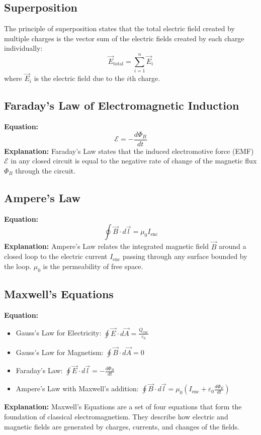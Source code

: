 \documentclass{article}
\begin{document}
\subsection*{Superposition}
The principle of superposition states that the total electric field created by multiple charges is the vector sum of the electric fields created by each charge individually:
\begin{equation}
    \vec{E}_{\text{total}} = \sum_{i=1}^{n} \vec{E}_i
\end{equation}
where $\vec{E}_i$ is the electric field due to the $i$th charge.


\subsection*{Faraday's Law of Electromagnetic Induction}
\textbf{Equation:} 
\[ \mathcal{E} = -\frac{d\Phi_B}{dt} \]
\textbf{Explanation:} 
Faraday's Law states that the induced electromotive force (EMF) \( \mathcal{E} \) in any closed circuit is equal to the negative rate of change of the magnetic flux \( \Phi_B \) through the circuit.

\subsection*{Ampere's Law}
\textbf{Equation:} 
\[ \oint \vec{B} \cdot d\vec{l} = \mu_0 I_{\text{enc}} \]
\textbf{Explanation:} 
Ampere's Law relates the integrated magnetic field \( \vec{B} \) around a closed loop to the electric current \( I_{\text{enc}} \) passing through any surface bounded by the loop. \( \mu_0 \) is the permeability of free space.

\subsection*{Maxwell's Equations}
\textbf{Equation:} 
\begin{itemize}
    \item Gauss's Law for Electricity: \( \oint \vec{E} \cdot d\vec{A} = \frac{Q_{\text{enc}}}{\varepsilon_0} \)
    \item Gauss's Law for Magnetism: \( \oint \vec{B} \cdot d\vec{A} = 0 \)
    \item Faraday's Law: \( \oint \vec{E} \cdot d\vec{l} = -\frac{d\Phi_B}{dt} \)
    \item Ampere's Law with Maxwell's addition: \( \oint \vec{B} \cdot d\vec{l} = \mu_0 (I_{\text{enc}} + \varepsilon_0 \frac{d\Phi_E}{dt}) \)
\end{itemize}
\textbf{Explanation:} 
Maxwell's Equations are a set of four equations that form the foundation of classical electromagnetism. They describe how electric and magnetic fields are generated by charges, currents, and changes of the fields.
\end{document}
